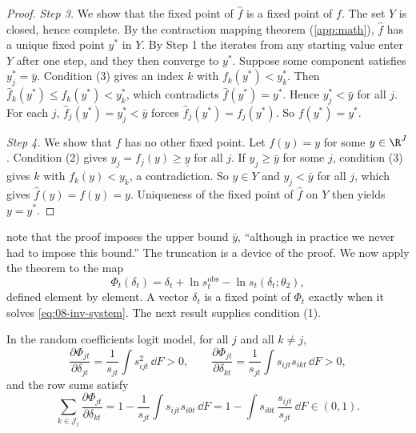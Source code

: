 \begin{proof}
\emph{Step 3.} We show that the fixed point of $\hat f$ is a fixed point of $f$. The set $Y$ is closed, hence complete. By
the contraction mapping theorem (\cref{app:math}), $\hat f$ has a unique fixed point $y^*$ in $Y$. By Step 1
the iterates from any starting value enter $Y$ after one step, and they then converge to $y^*$. Suppose some
component satisfies $y^*_j = \bar y$. Condition (3) gives an index $k$ with $f_k(y^*) < y^*_k$. Then $\hat
f_k(y^*) \leq f_k(y^*) < y^*_k$, which contradicts $\hat f(y^*) = y^*$. Hence $y^*_j < \bar y$ for all $j$.
For each $j$, $\hat f_j(y^*) = y^*_j < \bar y$ forces $\hat f_j(y^*) = f_j(y^*)$. So $f(y^*) = y^*$.

\emph{Step 4.} We show that $f$ has no other fixed point. Let $f(y) = y$ for some $y \in \R^J$. Condition (2) gives $y_j
= f_j(y) \geq \underline y$ for all $j$. If $y_j \geq \bar y$ for some $j$, condition (3) gives $k$ with
$f_k(y) < y_k$, a contradiction. So $y \in Y$ and $y_j < \bar y$ for all $j$, which gives $\hat f(y) = f(y) =
y$. Uniqueness of the fixed point of $\hat f$ on $Y$ then yields $y = y^*$.
\end{proof}

 note that the proof imposes the upper bound $\bar y$, ``although in
practice we never had to impose this bound.'' The truncation is a device of the proof. We now apply the
theorem to the map
\begin{equation}\label{eq:08-phi}
  \Phi_t(\delta_t) = \delta_t + \ln s^{\text{obs}}_t - \ln s_t(\delta_t;\theta_2),
\end{equation}
defined element by element. A vector $\delta_t$ is a fixed point of $\Phi_t$ exactly when it solves
\eqref{eq:08-inv-system}. The next result supplies condition (1).

\begin{corollary}\label{cor:08-rowsum}
In the random coefficients logit model, for all $j$ and all $k \neq j$,
\begin{equation*}
  \frac{\partial \Phi_{jt}}{\partial \delta_{jt}} = \frac{1}{s_{jt}}\int s_{ijt}^2\, \dd F > 0, \qquad
  \frac{\partial \Phi_{jt}}{\partial \delta_{kt}} = \frac{1}{s_{jt}}\int s_{ijt}s_{ikt}\, \dd F > 0,
\end{equation*}
and the row sums satisfy
\begin{equation}\label{eq:08-rowsum}
  \sum_{k \in \mathcal{J}_t}\frac{\partial \Phi_{jt}}{\partial \delta_{kt}} = 1 -
  \frac{1}{s_{jt}}\int s_{ijt}s_{i0t}\, \dd F = 1 - \int s_{i0t}\,\frac{s_{ijt}}{s_{jt}}\, \dd F \in (0,1).
\end{equation}
\end{corollary}

